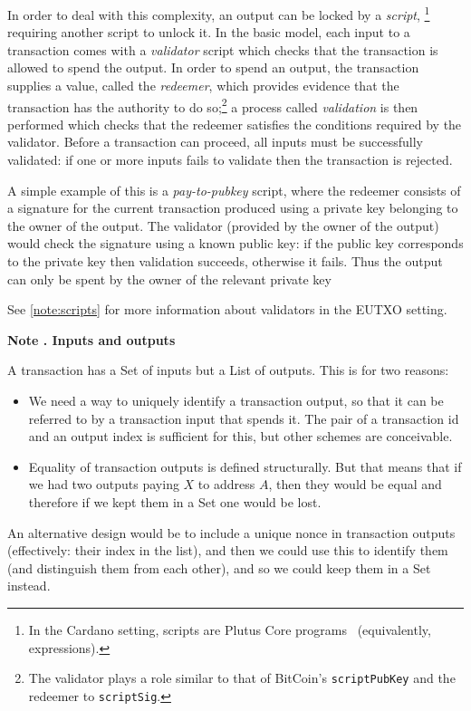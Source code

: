 \documentclass[a4paper]{article}
\newcounter{note}
\newcommand{\note}[1]{
  \bigskip
  \refstepcounter{note}
  \noindent\textbf{Note \thenote. #1}
}
\renewcommand{\i}{\textit}  %
\newcommand{\s}{\textsf}  %
\begin{document}
In order to deal with this complexity, an output can be locked by a
\textit{script},%
\footnote{In the Cardano setting, scripts are Plutus Core
  programs~\citep{Plutus-Core-spec} (equivalently, expressions).}
requiring another script to unlock it.  In the basic model, each input
to a transaction comes with a \i{validator} script which checks that
the transaction is allowed to spend the output.  In order to spend an
output, the transaction supplies a value, called the \i{redeemer},
which provides evidence that the transaction has the authority to do
so;\footnote{The validator plays a role similar to that of BitCoin's
  \texttt{scriptPubKey} and the redeemer to \texttt{scriptSig}.  } a
process called \i{validation} is then performed which checks that the
redeemer satisfies the conditions required by the validator.  Before a
transaction can proceed, all inputs must be successfully validated: if
one or more inputs fails to validate then the transaction is rejected.

A simple example of this is a \i{pay-to-pubkey} script, where the
redeemer consists of a signature for the current transaction produced
using a private key belonging to the owner of the output.  The
validator (provided by the owner of the output) would check the
signature using a known public key: if the public key corresponds to
the private key then validation succeeds, otherwise it fails.  Thus
the output can only be spent by the owner of the relevant private key

See \cref{note:scripts} for more information about validators in
the EUTXO setting.

\note{Inputs and outputs}
\label{note:inputs-and-outputs}
A transaction has a \textsf{Set} of inputs but a \textsf{List} of outputs.
This is for two reasons:
\begin{itemize}
  \item We need a way to uniquely identify a transaction output, so
  that it can be referred to by a transaction input that spends it. The pair of
  a transaction id and an output index is sufficient for this, but other schemes
  are conceivable.
  \item Equality of transaction outputs is defined structurally. But that means
    that if we had two outputs paying $X$ to address $A$, then they would be
    equal and therefore if we kept them in a \s{Set} one would be lost.
\end{itemize}

An alternative design would be to include a unique nonce in transaction outputs
(effectively: their index in the list), and then we could use this to identify
them (and distinguish them from each other), and so we could keep them in a \s{Set} instead.
\end{document}
